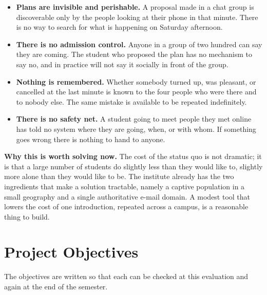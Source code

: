 \documentclass{tietreport}
\begin{document}
\begin{itemize}
  \item \textbf{Plans are invisible and perishable.} A proposal made in a chat group
        is discoverable only by the people looking at their phone in that minute.
        There is no way to search for what is happening on Saturday afternoon.

  \item \textbf{There is no admission control.} Anyone in a group of two hundred can
        say they are coming. The student who proposed the plan has no mechanism to
        say no, and in practice will not say it socially in front of the group.

  \item \textbf{Nothing is remembered.} Whether somebody turned up, was pleasant, or
        cancelled at the last minute is known to the four people who were there and
        to nobody else. The same mistake is available to be repeated indefinitely.

  \item \textbf{There is no safety net.} A student going to meet people they met
        online has told no system where they are going, when, or with whom. If
        something goes wrong there is nothing to hand to anyone.
\end{itemize}

\noindent\textbf{Why this is worth solving now.} The cost of the status quo is not
dramatic; it is that a large number of students do slightly less than they would
like to, slightly more alone than they would like to be. The institute already has
the two ingredients that make a solution tractable, namely a captive population in
a small geography and a single authoritative e-mail domain. A modest tool that
lowers the cost of one introduction, repeated across a campus, is a reasonable
thing to build.

\section{Project Objectives}

The objectives are written so that each can be checked at this evaluation and again
at the end of the semester.
\end{document}

